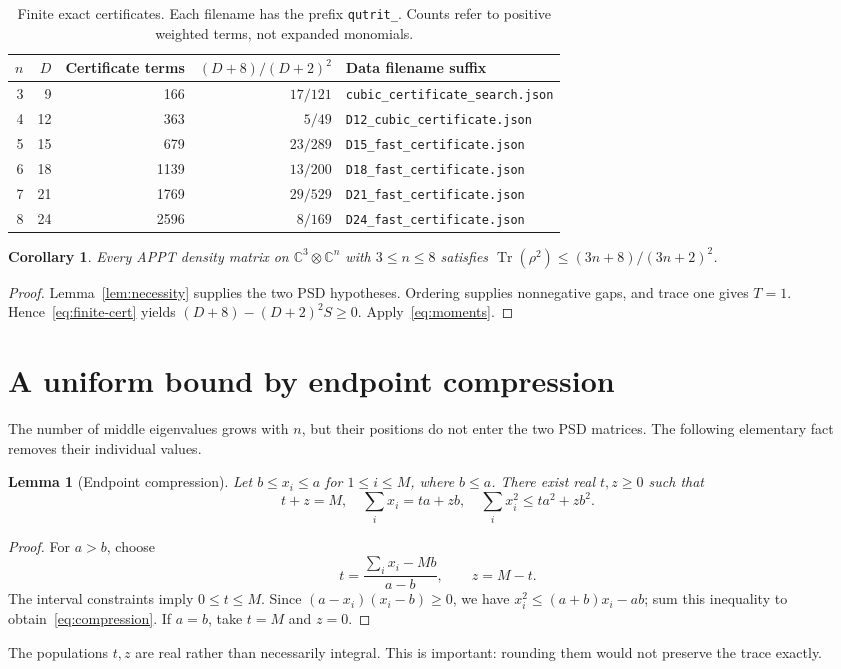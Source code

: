 \documentclass[11pt]{article}
\newtheorem{lemma}[theorem]{Lemma}
\newtheorem{corollary}[theorem]{Corollary}
\theoremstyle{remark}\newtheorem{remark}[theorem]{Remark}
\newcommand{\Tr}{\operatorname{Tr}}
\newcommand{\C}{\mathbb C}
\begin{document}
\begin{table}[ht]
\centering
\begin{tabular}{rrrrl}
\toprule
$n$&$D$&Certificate terms&$(D+8)/(D+2)^2$&Data filename suffix\\
\midrule
3&9&166&$17/121$&\texttt{cubic\_certificate\_search.json}\\
4&12&363&$5/49$&\texttt{D12\_cubic\_certificate.json}\\
5&15&679&$23/289$&\texttt{D15\_fast\_certificate.json}\\
6&18&1139&$13/200$&\texttt{D18\_fast\_certificate.json}\\
7&21&1769&$29/529$&\texttt{D21\_fast\_certificate.json}\\
8&24&2596&$8/169$&\texttt{D24\_fast\_certificate.json}\\
\bottomrule
\end{tabular}
\caption{Finite exact certificates. Each filename has the prefix \texttt{qutrit\_}. Counts refer to positive weighted terms, not expanded monomials.}\label{tab:finite}
\end{table}

\begin{corollary}\label{cor:finite}
Every APPT density matrix on $\C^3\otimes\C^n$ with $3\leq n\leq8$ satisfies $\Tr(\rho^2)\leq(3n+8)/(3n+2)^2$.
\end{corollary}
\begin{proof}
Lemma~\ref{lem:necessity} supplies the two PSD hypotheses. Ordering supplies nonnegative gaps, and trace one gives $T=1$. Hence~\eqref{eq:finite-cert} yields $(D+8)-(D+2)^2S\geq0$. Apply~\eqref{eq:moments}.
\end{proof}

\section{A uniform bound by endpoint compression}\label{sec:uniform}
The number of middle eigenvalues grows with $n$, but their positions do not enter the two PSD matrices. The following elementary fact removes their individual values.
\begin{lemma}[Endpoint compression]\label{lem:compression}
Let $b\leq x_i\leq a$ for $1\leq i\leq M$, where $b\leq a$. There exist real $t,z\geq0$ such that
\begin{equation}\label{eq:compression}
 t+z=M,\quad \sum_i x_i=ta+zb,\quad
 \sum_i x_i^2\leq ta^2+zb^2.
\end{equation}
\end{lemma}
\begin{proof}
For $a>b$, choose
\[
 t=\frac{\sum_i x_i-Mb}{a-b},\qquad z=M-t.
\]
The interval constraints imply $0\leq t\leq M$. Since $(a-x_i)(x_i-b)\geq0$, we have $x_i^2\leq(a+b)x_i-ab$; sum this inequality to obtain~\eqref{eq:compression}. If $a=b$, take $t=M$ and $z=0$.
\end{proof}
The populations $t,z$ are real rather than necessarily integral. This is important: rounding them would not preserve the trace exactly.
\end{document}
